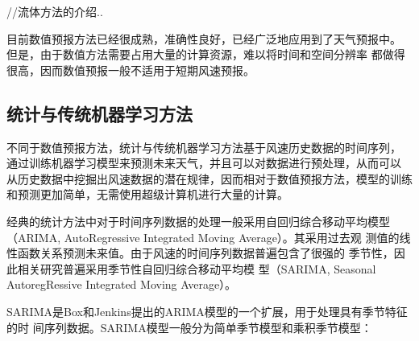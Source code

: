 \documentclass[AutoFakeBold]{LZUThesis}
\begin{document}
//流体方法的介绍..

目前数值预报方法已经很成熟，准确性良好，已经广泛地应用到了天气预报中。
但是，由于数值方法需要占用大量的计算资源，难以将时间和空间分辨率
都做得很高，因而数值预报一般不适用于短期风速预报。

\subsection{统计与传统机器学习方法}
不同于数值预报方法，统计与传统机器学习方法基于风速历史数据的时间序列，
通过训练机器学习模型来预测未来天气，并且可以对数据进行预处理，从而可以
从历史数据中挖掘出风速数据的潜在规律，因而相对于数值预报方法，模型的训练
和预测更加简单，无需使用超级计算机进行大量的计算。

经典的统计方法中对于时间序列数据的处理一般采用自回归综合移动平均模型
（ARIMA, AutoRegressive Integrated Moving Average）。其采用过去观
测值的线性函数关系预测未来值。由于风速的时间序列数据普遍包含了很强的
季节性，因此相关研究普遍采用季节性自回归综合移动平均模
型（SARIMA, Seasonal AutoregRessive Integrated 
Moving Average）\cite{haddad2019wind}。

SARIMA是Box和Jenkins提出的ARIMA模型的一个扩展，用于处理具有季节特征的时
间序列数据。SARIMA模型一般分为简单季节模型和乘积季节模型：
\end{document}
